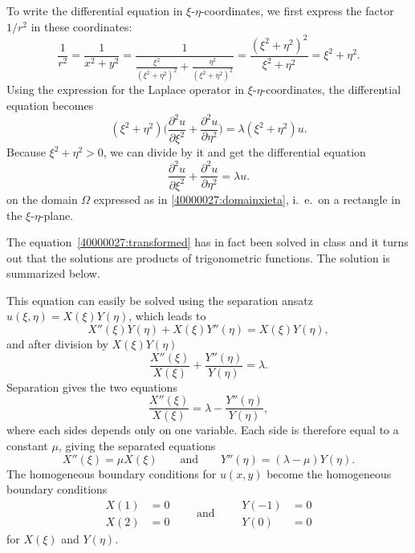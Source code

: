 \begin{loesung}
\begin{teilaufgaben}
\item
To write the differential equation in $\xi$-$\eta$-coordinates, we first
express the factor $1/r^2$ in these coordinates:
\[
\frac{1}{r^2}
=
\frac{1}{x^2+y^2}
=
\frac{1}{
\displaystyle
\frac{\xi^2}{(\xi^2+\eta^2)^2}
+
\frac{\eta^2}{(\xi^2+\eta^2)^2}
}
=
\frac{(\xi^2+\eta^2)^2}{\xi^2+\eta^2}
=
\xi^2+\eta^2.
\]
Using the expression for the Laplace operator in $\xi$-$\eta$-coordinates,
the differential equation becomes
\[
(\xi^2+\eta^2)
\biggl(
\frac{\partial^2 u}{\partial\xi^2}
+
\frac{\partial^2 u}{\partial\eta^2}
\biggr)
=
\lambda(\xi^2+\eta^2) u.
\]
Because $\xi^2+\eta^2>0$, we can divide by it and get the differential
equation
\begin{equation}
\frac{\partial^2 u}{\partial \xi^2}
+
\frac{\partial^2 u}{\partial \eta^2}
=
\lambda u.
\label{40000027:transformed}
\end{equation}
on the domain $\Omega$ expressed as in \eqref{40000027:domainxieta},
i.~e.~on a rectangle in the $\xi$-$\eta$-plane.
\item
The equation~\eqref{40000027:transformed}
has in fact been solved in class and it turns out
that the solutions are products of trigonometric functions.
The solution is summarized below.

This equation can easily be solved using the separation ansatz
$u(\xi,\eta)=X(\xi)Y(\eta)$, which leads to
\[
X''(\xi)Y(\eta)+X(\xi)Y''(\eta) = X(\xi)Y(\eta),
\]
and after division by $X(\xi)Y(\eta)$
\[
\frac{X''(\xi)}{X(\xi)}
+
\frac{Y''(\eta)}{Y(\eta)}
=
\lambda.
\]
Separation gives the two equations
\begin{equation}
\frac{X''(\xi)}{X(\xi)}
=
\lambda
-
\frac{Y''(\eta)}{Y(\eta)},
\label{40000027:dgl}
\end{equation}
where each sides depends only on one variable.
Each side is therefore equal to a constant $\mu$, giving
the separated equations
\[
X''(\xi) = \mu X(\xi)
\qquad\text{and}\qquad
Y''(\eta) = (\lambda -\mu) Y(\eta).
\]
The homogeneous boundary conditions for $u(x,y)$ become
the homogeneous boundary conditions
\[
\begin{aligned}
X(1)&=0\\
X(2)&=0
\end{aligned}
\qquad\text{and}\qquad
\begin{aligned}
Y(-1)&=0\\
Y(0)&=0
\end{aligned}
\]
for $X(\xi)$ and $Y(\eta)$.
\qedhere
\end{teilaufgaben}
\end{loesung}

